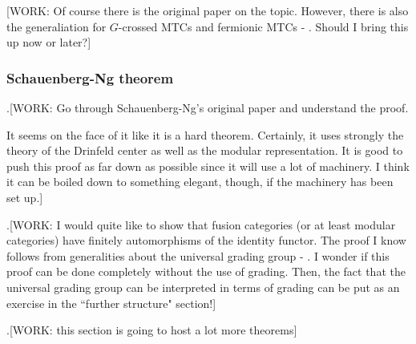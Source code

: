[WORK: Of course there is the original paper on the topic. However, there is also the generaliation for $G$-crossed MTCs and fermionic MTCs - \cite{jones2021rank}. Should I bring this up now or later?]


\subsubsection{Schauenberg-Ng theorem}

.[WORK: Go through Schauenberg-Ng's original paper and understand the proof.

It seems on the face of it like it is a hard theorem. Certainly, it uses strongly the theory of the Drinfeld center as well as the modular representation. It is good to push this proof as far down as possible since it will use a lot of machinery. I think it can be boiled down to something elegant, though, if the machinery has been set up.]


.[WORK: I would quite like to show that fusion categories (or at least modular categories) have finitely automorphisms of the identity functor. The proof I know follows from generalities about the universal grading group - \cite{gelaki2008nilpotent}. I wonder if this proof can be done completely without the use of grading. Then, the fact that the universal grading group can be interpreted in terms of grading can be put as an exercise in the ``further structure" section!]


.[WORK: this section is going to host a lot more theorems]



